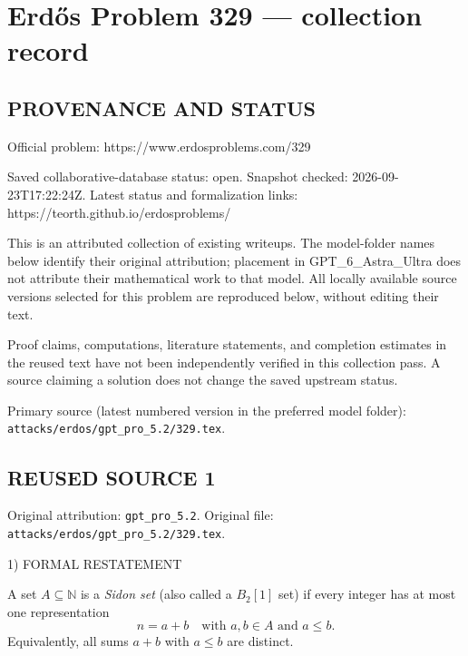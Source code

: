 \section*{Erd\H{o}s Problem 329 --- collection record}

\subsection*{PROVENANCE AND STATUS}
Official problem: https://www.erdosproblems.com/329

Saved collaborative-database status: open.
Snapshot checked: 2026-09-23T17:22:24Z.
Latest status and formalization links: https://teorth.github.io/erdosproblems/

This is an attributed collection of existing writeups. The model-folder names below identify their original attribution; placement in GPT\_6\_Astra\_Ultra does not attribute their mathematical work to that model. All locally available source versions selected for this problem are reproduced below, without editing their text.

Proof claims, computations, literature statements, and completion estimates in the reused text have not been independently verified in this collection pass. A source claiming a solution does not change the saved upstream status.

Primary source (latest numbered version in the preferred model folder): \texttt{attacks/erdos/gpt\_pro\_5.2/329.tex}.

\subsection*{REUSED SOURCE 1}
Original attribution: \texttt{gpt\_pro\_5.2}.
Original file: \texttt{attacks/erdos/gpt\_pro\_5.2/329.tex}.


1) FORMAL RESTATEMENT

A set $A\subseteq\mathbb N$ is a \emph{Sidon set} (also called a $B_2[1]$ set) if every integer has at most one representation
\[
n=a+b\quad\text{with }a,b\in A\text{ and }a\le b.
\]
Equivalently, all sums $a+b$ with $a\le b$ are distinct.

